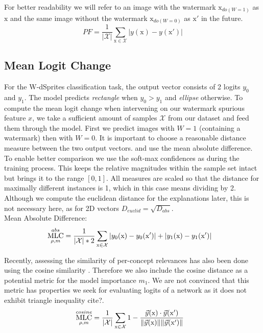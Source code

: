 For better readability we will refer to an image with the watermark $\mathrm{x}_{do(W=1)}$ as $\mathrm{x}$ and the same image without the watermark $\mathrm{x}_{do(W=0)}$ as $\mathrm{x}'$ in the future.
\begin{equation}
\displaystyle 
PF =\frac{1}{|\mathcal{X}|} \sum_{\mathrm{x} \in \mathcal{X}} |y(\mathrm{x}) - y(\mathrm{x}') |
\end{equation}


\subsection{Mean Logit Change}
For the W-dSprites classification task, the output vector consists of 2 logits $y_0$ and $y_1$. The model predicts \textit{rectangle} when $y_0 > y_1$ and \textit{ellipse} otherwise. To compute the mean logit change when intervening on our watermark spurious feature $x$, we take a sufficient amount of samples $\mathcal{X}$ from our dataset and feed them through the model. First we predict images with $W=1$ (containing a watermark) then with $W=0$. It is important to choose a reasonable distance measure between the two output vectors. \cite{Sixt2022a} and \cite{Goyal2019} use the mean absolute difference. To enable better comparison we use the soft-max confidences as during the training process. This keeps the relative magnitudes within the sample set intact but brings it to the range $[0,1]$. All measures are scaled so that the distance for maximally different instances is 1, which in this case means dividing by 2. Although we compute the euclidean distance for the explanations later, this is not necessary here, as for 2D vectors $D_{euclid} = \sqrt{D_{abs}}$.\\

Mean Absolute Difference:
\begin{align}\displaystyle 
& \operatorname*{MLC}_{\rho, m}^{abs} = \frac{1}{|\mathcal{X}| * 2} \sum_{\mathrm{x} \in \mathcal{X}} 
|y_0(\mathrm{x}) -y_0(\mathrm{x}')| + |y_1(\mathrm{x}) -y_1(\mathrm{x}')| 
\end{align}

Recently, assessing the similarity of per-concept relevances has also been done using the cosine similarity \cite{Sixt2020, Achtibat2022}. Therefore we also include the cosine distance as a potential metric for the model importance $m_1$. We are not convinced that this metric has properties we seek for evaluating logits of a network as it does not exhibit triangle inequality cite?.  
\begin{align}\displaystyle 
& \operatorname*{MLC}_{\rho, m}^{cosine} = \frac{1}{|\mathcal{X}|}\sum_{\mathrm{x} \in \mathcal{X}}  
1 - \frac{\vec{y}(\mathrm{x}) \cdot \vec{y}(\mathrm{x}')}
{\lVert \vec{y}(\mathrm{x}) \rVert \lVert \vec{y}(\mathrm{x}')\rVert }
\end{align}


